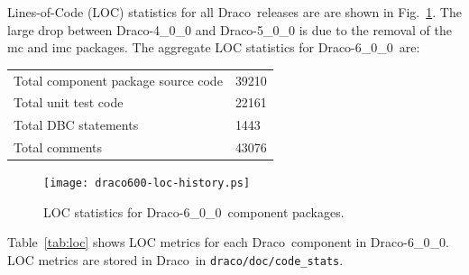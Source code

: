 \documentclass[note]{ResearchNote}
\newcommand{\draco}{Draco}
\newcommand{\dracor}{\draco-6\_0\_0}
\begin{document}
Lines-of-Code (LOC) statistics for all \draco\ releases are are shown
in Fig.~\ref{fig:stats}.  The large drop between \draco-4\_0\_0 and
\draco-5\_0\_0 is due to the removal of the \textsf{mc} and
\textsf{imc} packages. The aggregate LOC statistics for \dracor\ are:
\begin{center}
  \begin{tabular}{|l|l|} \hline
    Total component package source code & 39210 \\
    Total unit test code & 22161 \\
    Total DBC statements & 1443 \\
    Total comments & 43076 \\
    \hline
  \end{tabular}
\end{center}
\begin{figure}
  \label{fig:stats}
  \centerline{
    \texttt{[image: draco600-loc-history.ps]}}
  \caption{LOC statistics for \dracor\ component packages.}
\end{figure}
Table~\ref{tab:loc} shows LOC metrics for each \draco\ component in
\dracor.  LOC metrics are stored in \draco\ in
\texttt{draco/doc/code\_stats}.
\end{document}
